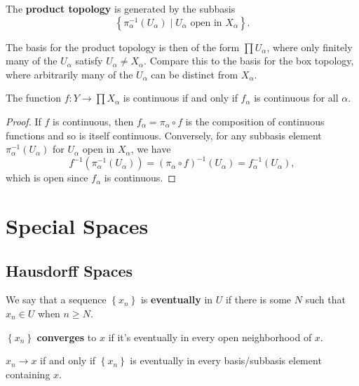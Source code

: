 \documentclass[twoside,10pt]{report}
\begin{document}
\begin{defn}[]
The \textbf{product topology} is generated by the subbasis
\[
	\left\{ \pi_{\alpha}^{-1}(U_{\alpha}) \;|\; U_{\alpha} \text{ open in } X _{\alpha} \right\}.
\]
\end{defn}
The basis for the product topology is then of the form $\prod U_{\alpha}$, where only finitely many of the $U_{\alpha}$ satisfy $U_{\alpha}\neq X_{\alpha}$. Compare this to the basis for the box topology, where arbitrarily many of the $U_{\alpha}$ can be distinct from $X_{\alpha}$.

\begin{prop}
The function $f:Y\to \prod X_{\alpha}$ is continuous if and only if $f_{\alpha}$ is continuous for all $\alpha$.
\end{prop}
\begin{proof}
	If $f$ is continuous, then $f_{\alpha}=\pi_{\alpha} \circ f$ is the composition of continuous functions and so is itself continuous. Conversely, for any subbasis element $\pi^{-1}_{\alpha}(U_{\alpha})$ for $U_{\alpha}$ open in $X_{\alpha}$, we have
	\[
		f^{-1}(\pi_{\alpha}^{-1}(U_{\alpha})) = (\pi_{\alpha} \circ f)^{-1}(U_{\alpha}) = f_{\alpha}^{-1}(U_{\alpha}),
	\] which is open since $f_{\alpha}$ is continuous.
\end{proof}


\chapter{Special Spaces}


\section{Hausdorff Spaces}

We say that a sequence $\left\{ x_n \right\}$ is \textbf{eventually} in $U$ if there is some $N$ such that $x_n \in U$ when $n \geq N$.

\begin{defn}[]
$\left\{ x_n \right\}$ \textbf{converges} to $x$ if it's eventually in every open neighborhood of $x$.
\end{defn}

\begin{prop}
$x_{n} \to x$ if and only if $\left\{ x_n \right\}$ is eventually in every basis/subbasis element containing $x$.
\end{prop}
\end{document}
